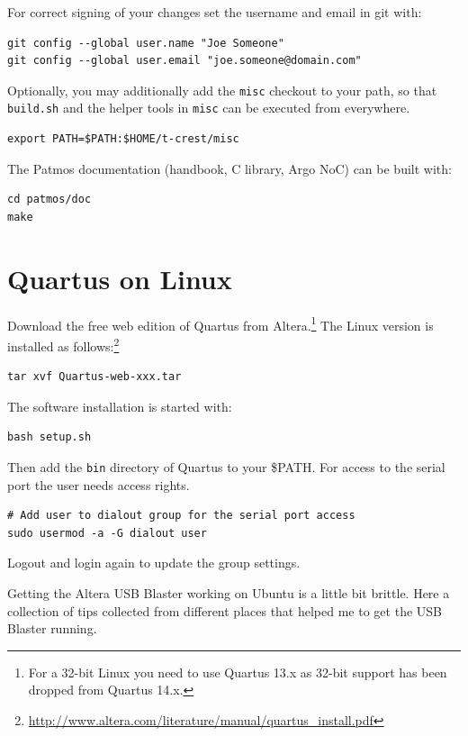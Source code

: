 \documentclass[a4paper,fontsize=10pt,twoside,DIV15,BCOR12mm,headinclude=true,footinclude=false,pagesize,bibtotoc]{scrbook}
\newcommand{\code}[1]{{\texttt{#1}}}
\begin{document}
For correct signing of your changes set the username and email in git with:

\begin{verbatim}
git config --global user.name "Joe Someone"
git config --global user.email "joe.someone@domain.com"
\end{verbatim}

Optionally, you may additionally add the \code{misc} checkout to your path, so that \code{build.sh} and the helper tools in 
\code{misc} can be executed from everywhere.

\begin{verbatim}
export PATH=$PATH:$HOME/t-crest/misc
\end{verbatim}

The Patmos documentation (handbook, C library, Argo NoC) can be built with:

\begin{verbatim}
cd patmos/doc
make
\end{verbatim}

\section{Quartus on Linux}

Download the free web edition of Quartus from Altera.\footnote{For a 32-bit Linux you need to
use Quartus 13.x as 32-bit support has been dropped from Quartus 14.x.}
The Linux version is
installed as follows:\footnote{\url{http://www.altera.com/literature/manual/quartus_install.pdf}}

\begin{verbatim}
tar xvf Quartus-web-xxx.tar
\end{verbatim}

The software installation is started with:

\begin{verbatim}
bash setup.sh
\end{verbatim}

Then add the \code{bin} directory of Quartus to your \$PATH.
%
For access to the serial port the user needs access rights.

\begin{verbatim}
# Add user to dialout group for the serial port access
sudo usermod -a -G dialout user
\end{verbatim}

Logout and login again to update the group settings.

Getting the Altera USB Blaster working on Ubuntu is a little bit brittle.
Here a collection of tips collected from different places that helped me to
get the USB Blaster running.
\end{document}
